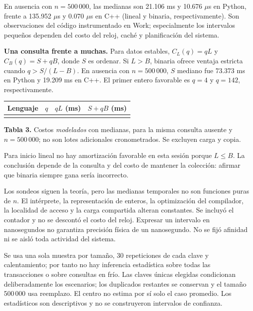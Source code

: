 \documentclass[10pt,a4paper]{article}
\newcommand{\titulo}[1]{\vspace{3pt}{\large\bfseries\color{azul}#1}\par}
\begin{document}
En ausencia con $n=500\,000$, las medianas son 21.106 ms y 10.676 $\mu$s en Python, frente a 135.952 $\mu$s y 0.070 $\mu$s en C++ (lineal y binaria, respectivamente). Son observaciones del código instrumentado en Work; especialmente los intervalos pequeños dependen del costo del reloj, caché y planificación del sistema.

\textbf{Una consulta frente a muchas.} Para datos estables, $C_L(q)=qL$ y $C_B(q)=S+qB$, donde $S$ es ordenar. Si $L>B$, binaria ofrece ventaja estricta cuando $q>S/(L-B)$. En ausencia con $n=500\,000$, $S$ mediano fue 73.373 ms en Python y 19.209 ms en C++. El primer entero favorable es $q=4$ y $q=142$, respectivamente.
\begin{center}\small
\begin{tabular}{lrrr}
\toprule
Lenguaje & $q$ & $qL$ (ms) & $S+qB$ (ms)\\\midrule

\\[-6pt]\bottomrule
\end{tabular}\end{center}
{\small\textbf{Tabla 3.} Costos \emph{modelados} con medianas, para la misma consulta ausente y $n=500\,000$; no son lotes adicionales cronometrados. Se excluyen carga y copia.}

Para inicio lineal no hay amortización favorable en esta sesión porque $L\le B$. La conclusión depende de la consulta y del costo de mantener la colección: afirmar que binaria siempre gana sería incorrecto.

\newpage
\titulo{7. Discusión de discrepancias y limitaciones}
Los sondeos siguen la teoría, pero las medianas temporales no son funciones puras de $n$. El intérprete, la representación de enteros, la optimización del compilador, la localidad de acceso y la carga compartida alteran constantes. Se incluyó el contador y no se descontó el costo del reloj. Expresar un intervalo en nanosegundos no garantiza precisión física de un nanosegundo. No se fijó afinidad ni se aisló toda actividad del sistema.

Se usa una sola muestra por tamaño, 30 repeticiones de cada clave y calentamiento; por tanto no hay inferencia estadística sobre todas las transacciones o sobre consultas en frío. Las claves únicas elegidas condicionan deliberadamente los escenarios; los duplicados restantes se conservan y el tamaño 500\,000 usa reemplazo. El centro no estima por sí solo el caso promedio. Los estadísticos son descriptivos y no se construyeron intervalos de confianza.
\end{document}
